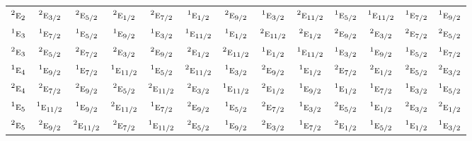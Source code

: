 \documentclass[10pt,a4paper]{article}
\numberwithin{equation}{section}
\newcommand{\irr}[1]{\text{\normalfont\scshape #1}}
\newcommand{\conjpair}[1]{{}^{#1}}
\begin{document}
{\begin{longtable}{@{}lcccccccccccc@{}}
$\conjpair{2}\irr{e}_{2}$ & $\conjpair{2}\irr{e}_{3/2}$ & $\conjpair{2}\irr{e}_{5/2}$ & $\conjpair{2}\irr{e}_{1/2}$ & $\conjpair{2}\irr{e}_{7/2}$ & $\conjpair{1}\irr{e}_{1/2}$ & $\conjpair{2}\irr{e}_{9/2}$ & $\conjpair{1}\irr{e}_{3/2}$ & $\conjpair{2}\irr{e}_{11/2}$ & $\conjpair{1}\irr{e}_{5/2}$ & $\conjpair{1}\irr{e}_{11/2}$ & $\conjpair{1}\irr{e}_{7/2}$ & $\conjpair{1}\irr{e}_{9/2}$\\
$\conjpair{1}\irr{e}_{3}$ & $\conjpair{1}\irr{e}_{7/2}$ & $\conjpair{1}\irr{e}_{5/2}$ & $\conjpair{1}\irr{e}_{9/2}$ & $\conjpair{1}\irr{e}_{3/2}$ & $\conjpair{1}\irr{e}_{11/2}$ & $\conjpair{1}\irr{e}_{1/2}$ & $\conjpair{2}\irr{e}_{11/2}$ & $\conjpair{2}\irr{e}_{1/2}$ & $\conjpair{2}\irr{e}_{9/2}$ & $\conjpair{2}\irr{e}_{3/2}$ & $\conjpair{2}\irr{e}_{7/2}$ & $\conjpair{2}\irr{e}_{5/2}$\\
$\conjpair{2}\irr{e}_{3}$ & $\conjpair{2}\irr{e}_{5/2}$ & $\conjpair{2}\irr{e}_{7/2}$ & $\conjpair{2}\irr{e}_{3/2}$ & $\conjpair{2}\irr{e}_{9/2}$ & $\conjpair{2}\irr{e}_{1/2}$ & $\conjpair{2}\irr{e}_{11/2}$ & $\conjpair{1}\irr{e}_{1/2}$ & $\conjpair{1}\irr{e}_{11/2}$ & $\conjpair{1}\irr{e}_{3/2}$ & $\conjpair{1}\irr{e}_{9/2}$ & $\conjpair{1}\irr{e}_{5/2}$ & $\conjpair{1}\irr{e}_{7/2}$\\
$\conjpair{1}\irr{e}_{4}$ & $\conjpair{1}\irr{e}_{9/2}$ & $\conjpair{1}\irr{e}_{7/2}$ & $\conjpair{1}\irr{e}_{11/2}$ & $\conjpair{1}\irr{e}_{5/2}$ & $\conjpair{2}\irr{e}_{11/2}$ & $\conjpair{1}\irr{e}_{3/2}$ & $\conjpair{2}\irr{e}_{9/2}$ & $\conjpair{1}\irr{e}_{1/2}$ & $\conjpair{2}\irr{e}_{7/2}$ & $\conjpair{2}\irr{e}_{1/2}$ & $\conjpair{2}\irr{e}_{5/2}$ & $\conjpair{2}\irr{e}_{3/2}$\\
$\conjpair{2}\irr{e}_{4}$ & $\conjpair{2}\irr{e}_{7/2}$ & $\conjpair{2}\irr{e}_{9/2}$ & $\conjpair{2}\irr{e}_{5/2}$ & $\conjpair{2}\irr{e}_{11/2}$ & $\conjpair{2}\irr{e}_{3/2}$ & $\conjpair{1}\irr{e}_{11/2}$ & $\conjpair{2}\irr{e}_{1/2}$ & $\conjpair{1}\irr{e}_{9/2}$ & $\conjpair{1}\irr{e}_{1/2}$ & $\conjpair{1}\irr{e}_{7/2}$ & $\conjpair{1}\irr{e}_{3/2}$ & $\conjpair{1}\irr{e}_{5/2}$\\
$\conjpair{1}\irr{e}_{5}$ & $\conjpair{1}\irr{e}_{11/2}$ & $\conjpair{1}\irr{e}_{9/2}$ & $\conjpair{2}\irr{e}_{11/2}$ & $\conjpair{1}\irr{e}_{7/2}$ & $\conjpair{2}\irr{e}_{9/2}$ & $\conjpair{1}\irr{e}_{5/2}$ & $\conjpair{2}\irr{e}_{7/2}$ & $\conjpair{1}\irr{e}_{3/2}$ & $\conjpair{2}\irr{e}_{5/2}$ & $\conjpair{1}\irr{e}_{1/2}$ & $\conjpair{2}\irr{e}_{3/2}$ & $\conjpair{2}\irr{e}_{1/2}$\\
$\conjpair{2}\irr{e}_{5}$ & $\conjpair{2}\irr{e}_{9/2}$ & $\conjpair{2}\irr{e}_{11/2}$ & $\conjpair{2}\irr{e}_{7/2}$ & $\conjpair{1}\irr{e}_{11/2}$ & $\conjpair{2}\irr{e}_{5/2}$ & $\conjpair{1}\irr{e}_{9/2}$ & $\conjpair{2}\irr{e}_{3/2}$ & $\conjpair{1}\irr{e}_{7/2}$ & $\conjpair{2}\irr{e}_{1/2}$ & $\conjpair{1}\irr{e}_{5/2}$ & $\conjpair{1}\irr{e}_{1/2}$ & $\conjpair{1}\irr{e}_{3/2}$\\

\end{longtable}}
\end{document}
